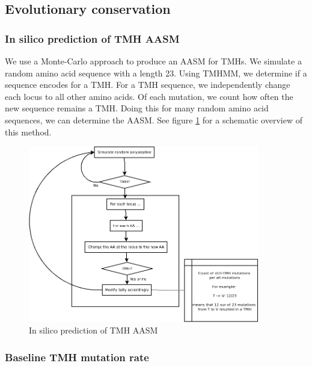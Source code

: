 \documentclass{article}
\begin{document}
\subsection{Evolutionary conservation}

\subsubsection{In silico prediction of TMH AASM}

We use a Monte-Carlo approach to produce an AASM for TMHs.
We simulate a random amino acid sequence with a length 23.
Using TMHMM, we determine if a sequence encodes for a TMH.
For a TMH sequence, we independently change 
each locus to all other amino acids.
Of each mutation, we count how often the new sequence remains a TMH.
Doing this for many random amino acid sequences, we can determine
the AASM. See figure \ref{fig:tmh_aasm_method} for a schematic
overview of this method.

\begin{figure}[!htbp]
  \includegraphics[width=0.9\textwidth]{tmh_aasm_method.png}
  \caption{
    In silico prediction of TMH AASM
  }
  \label{fig:tmh_aasm_method}
\end{figure}

\subsubsection{Baseline TMH mutation rate}
\end{document}
